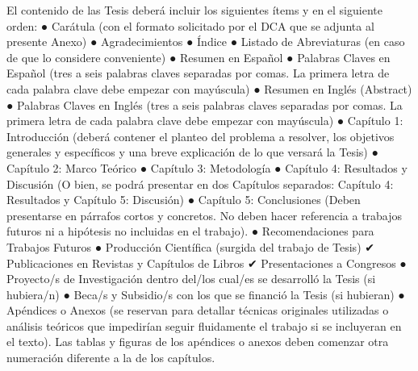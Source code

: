 El contenido de las Tesis deberá incluir los siguientes ítems y en el siguiente orden:\newline
●	Carátula (con el formato solicitado por el DCA que se adjunta al presente Anexo)\newline
●	Agradecimientos\newline
●	Índice\newline
●	Listado de Abreviaturas (en caso de que lo considere conveniente)\newline
●	Resumen en Español\newline
●	Palabras Claves en Español (tres a seis palabras claves separadas por comas. La primera letra de cada palabra clave debe empezar con mayúscula)\newline
●	Resumen en Inglés (Abstract)\newline
●	Palabras Claves en Inglés (tres a seis palabras claves separadas por comas. La primera letra de cada palabra clave debe empezar con mayúscula)\newline
●	Capítulo 1: Introducción (deberá contener el planteo del problema a resolver, los objetivos generales y específicos y una breve explicación de lo que versará la Tesis)\newline
●	Capítulo 2: Marco Teórico\newline
●	Capítulo 3: Metodología\newline
●	Capítulo 4: Resultados y Discusión (O bien, se podrá presentar en dos Capítulos separados: Capítulo 4: Resultados y Capítulo 5: Discusión)\newline
●	Capítulo 5: Conclusiones (Deben presentarse en párrafos cortos y concretos. No deben hacer referencia a trabajos futuros ni a hipótesis no incluidas en el trabajo).\newline
●	Recomendaciones para Trabajos Futuros\newline
●	Producción Científica (surgida del trabajo de Tesis)\newline
✔	Publicaciones en Revistas y Capítulos de Libros\newline
✔	Presentaciones a Congresos\newline
●	Proyecto/s de Investigación dentro del/los cual/es se desarrolló la Tesis (si hubiera/n)\newline
●	Beca/s y Subsidio/s con los que se financió la Tesis (si hubieran)\newline
●	Apéndices o Anexos (se reservan para detallar técnicas originales utilizadas o análisis teóricos que impedirían seguir fluidamente el trabajo si se incluyeran en el texto). Las tablas y figuras de los apéndices o anexos deben comenzar otra numeración diferente a la de los capítulos.\newline

